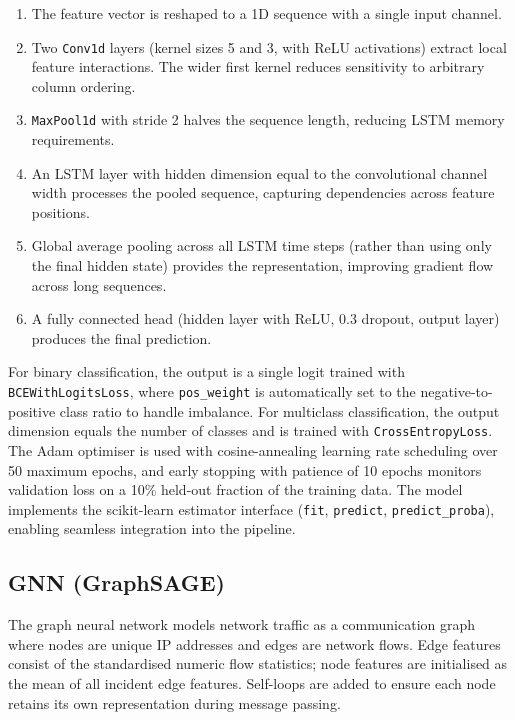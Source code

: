 \documentclass[12pt,a4paper]{report}
\begin{document}
\begin{enumerate}
  \item The feature vector is reshaped to a 1D sequence with a single input channel.
  \item Two \texttt{Conv1d} layers (kernel sizes 5 and 3, with ReLU activations) extract local feature interactions. The wider first kernel reduces sensitivity to arbitrary column ordering.
  \item \texttt{MaxPool1d} with stride 2 halves the sequence length, reducing LSTM memory requirements.
  \item An LSTM layer with hidden dimension equal to the convolutional channel width processes the pooled sequence, capturing dependencies across feature positions.
  \item Global average pooling across all LSTM time steps (rather than using only the final hidden state) provides the representation, improving gradient flow across long sequences.
  \item A fully connected head (hidden layer with ReLU, 0.3 dropout, output layer) produces the final prediction.
\end{enumerate}

For binary classification, the output is a single logit trained with \texttt{BCEWithLogitsLoss}, where \texttt{pos\_weight} is automatically set to the negative-to-positive class ratio to handle imbalance. For multiclass classification, the output dimension equals the number of classes and is trained with \texttt{CrossEntropyLoss}. The Adam optimiser is used with cosine-annealing learning rate scheduling over 50 maximum epochs, and early stopping with patience of 10 epochs monitors validation loss on a 10\% held-out fraction of the training data. The model implements the scikit-learn estimator interface (\texttt{fit}, \texttt{predict}, \texttt{predict\_proba}), enabling seamless integration into the pipeline.

\subsection{GNN (GraphSAGE)}
\label{sec:gnn}

The graph neural network models network traffic as a communication graph where nodes are unique IP addresses and edges are network flows. Edge features consist of the standardised numeric flow statistics; node features are initialised as the mean of all incident edge features. Self-loops are added to ensure each node retains its own representation during message passing.
\end{document}
